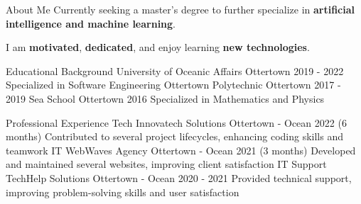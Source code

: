 \documentclass{article}
\begin{document}
\begin{minipage}{\textwidth}
{\begin{bentosection}{About Me}
            Currently seeking a master's degree to further specialize in 
            \textbf{artificial intelligence and machine learning}.

            I am \textbf{motivated}, \textbf{dedicated}, and enjoy learning \textbf{new technologies}.
        \end{bentosection}
        \begin{bentosection}{Educational Background}
            {University of Oceanic Affairs}
            {Ottertown}
            {2019 - 2022}
            {Specialized in Software Engineering}
            {Ottertown Polytechnic}
            {Ottertown}
            {2017 - 2019}
            {}
            {Sea School}
            {Ottertown}
            {2016}
            {Specialized in Mathematics and Physics}
        \end{bentosection}
        \begin{bentosection}{Professional Experience}
            {Tech}
            {Innovatech Solutions}
            {Ottertown - Ocean}
            {2022 (6 months)}
            {Contributed to several project lifecycles, enhancing coding skills and teamwork}
            {IT}
            {WebWaves Agency}
            {Ottertown - Ocean}
            {2021 (3 months)}
            {Developed and maintained several websites, improving client satisfaction}
            {IT Support}
            {TechHelp Solutions}
            {Ottertown - Ocean}
            {2020 - 2021}
            {Provided technical support, improving problem-solving skills and user satisfaction}
        \end{bentosection}
    }
\end{minipage}
\end{document}
